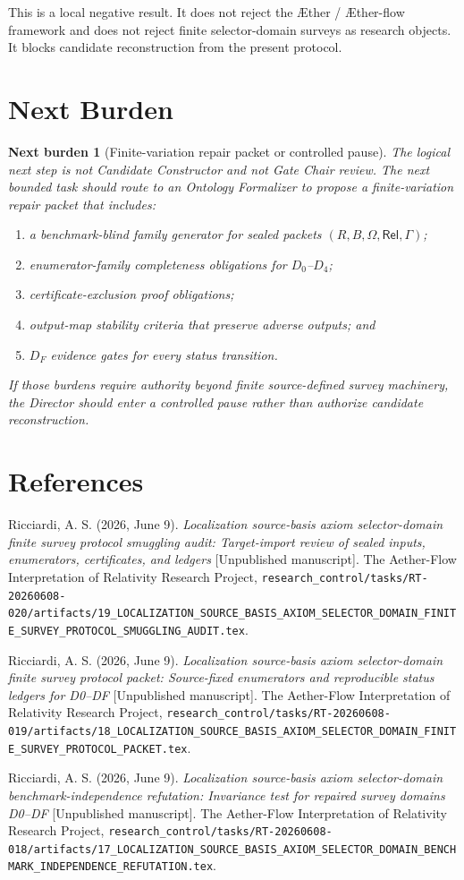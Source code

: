 \documentclass[11pt]{article}
\newcommand{\Aether}{\AE{}ther}
\newcommand{\Aflow}{\AE{}ther-flow}
\newcommand{\TheoryProgram}{\Aether{} / \Aflow{} framework}
\newcommand{\Rel}{\mathsf{Rel}}
\newcommand{\GammaB}{\Gamma}
\newtheorem{nextburden}{Next burden}
\begin{document}
This is a local negative result. It does not reject the \TheoryProgram{} and
does not reject finite selector-domain surveys as research objects. It blocks
candidate reconstruction from the present protocol.

\section{Next Burden}

\begin{nextburden}[Finite-variation repair packet or controlled pause]
The logical next step is not Candidate Constructor and not Gate Chair review.
The next bounded task should route to an Ontology Formalizer to propose a
finite-variation repair packet that includes:
\begin{enumerate}
    \item a benchmark-blind family generator for sealed packets
    \((R,B,\Omega,\Rel,\GammaB)\);
    \item enumerator-family completeness obligations for \(D_0\)--\(D_4\);
    \item certificate-exclusion proof obligations;
    \item output-map stability criteria that preserve adverse outputs; and
    \item \(D_F\) evidence gates for every status transition.
\end{enumerate}
If those burdens require authority beyond finite source-defined survey
machinery, the Director should enter a controlled pause rather than
authorize candidate reconstruction.
\end{nextburden}

\section*{References}

Ricciardi, A. S. (2026, June 9). \emph{Localization source-basis axiom
selector-domain finite survey protocol smuggling audit: Target-import review
of sealed inputs, enumerators, certificates, and ledgers} [Unpublished
manuscript]. The Aether-Flow Interpretation of Relativity Research Project,
\texttt{research\_control/tasks/RT-20260608-020/artifacts/19\_LOCALIZATION\_SOURCE\_BASIS\_AXIOM\_SELECTOR\_DOMAIN\_FINITE\_SURVEY\_PROTOCOL\_SMUGGLING\_AUDIT.tex}.

Ricciardi, A. S. (2026, June 9). \emph{Localization source-basis axiom
selector-domain finite survey protocol packet: Source-fixed enumerators and
reproducible status ledgers for D0--DF} [Unpublished manuscript]. The
Aether-Flow Interpretation of Relativity Research Project,
\texttt{research\_control/tasks/RT-20260608-019/artifacts/18\_LOCALIZATION\_SOURCE\_BASIS\_AXIOM\_SELECTOR\_DOMAIN\_FINITE\_SURVEY\_PROTOCOL\_PACKET.tex}.

Ricciardi, A. S. (2026, June 9). \emph{Localization source-basis axiom
selector-domain benchmark-independence refutation: Invariance test for
repaired survey domains D0--DF} [Unpublished manuscript]. The Aether-Flow
Interpretation of Relativity Research Project,
\texttt{research\_control/tasks/RT-20260608-018/artifacts/17\_LOCALIZATION\_SOURCE\_BASIS\_AXIOM\_SELECTOR\_DOMAIN\_BENCHMARK\_INDEPENDENCE\_REFUTATION.tex}.
\end{document}

